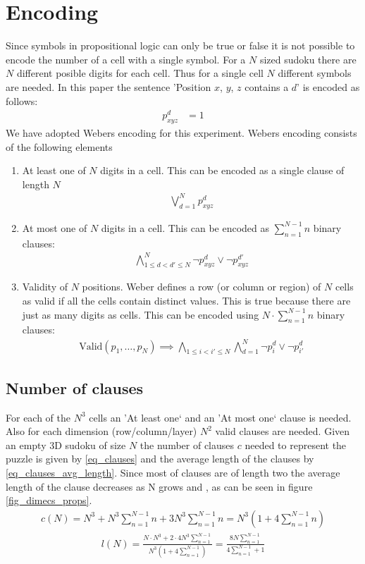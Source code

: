 \documentclass{article}
\begin{document}
\section{Encoding}
Since symbols in propositional logic can only be true or false it is not possible to encode the number of a cell with a single symbol. For a $N$ sized sudoku there are $N$ different posible digits for each cell. Thus for a single cell $N$ different symbols are needed. In this paper the sentence 'Position $x$, $y$, $z$ contains a $d$' is encoded as follows:
\begin{align}
  p_{xyz}^d &= 1
\end{align}
We have adopted Webers \cite{weber2005sat} encoding for this experiment. Webers encoding consists of the following elements
\begin{enumerate}
  \item At least one of $N$ digits in a cell. This can be encoded as a single clause of length $N$
    \begin{align}
      \bigvee_{d=1}^N p_{xyz}^d
    \end{align}
  \item At most one of $N$ digits in a cell. This can be encoded as $\sum_{n=1}^{N-1}n$ binary clauses:
    \begin{align}
      \bigwedge_{1 \leq d < d' \leq N}^N \neg p_{xyz}^d \vee \neg p_{xyz}^{d'}
    \end{align}
  \item Validity of $N$ positions. Weber defines a row (or column or region) of $N$ cells as valid if all the cells contain distinct values. This is true because there are just as many digits as cells. This can be encoded using $N \cdot \sum_{n=1}^{N-1}n$ binary clauses:
    \begin{align}
      \text{Valid}(p_1,\dots,p_N) \implies \bigwedge_{1 \leq i < i' \leq N}\bigwedge_{d=1}^N \neg p_{i}^d \vee \neg p_{i'}^{d}
    \end{align}
\end{enumerate}

\subsection{Number of clauses}
For each of the $N^3$ cells an 'At least one` and an 'At most one` clause is needed. Also for each dimension (row/column/layer) $N^2$ valid clauses are needed. Given an empty 3D sudoku of size $N$ the number of clauses $c$ needed to represent the puzzle is given by \ref{eq_clauses} and the average length of the clauses by \ref{eq_clauses_avg_length}. Since most of clauses are of length two the average length of the clause decreases as N grows and , as can be seen in figure \ref{fig_dimecs_props}.
\begin{align}
  \label{eq_clauses}
  c(N) = N^3 + N^3 \sum_{n=1}^{N-1}n + 3N^3\sum_{n=1}^{N-1}n = N^3(1 + 4\sum_{n=1}^{N-1}n)
\end{align}
\begin{align}
  \label{eq_clauses_avg_length}
  l(N) = \frac{N\cdot N^3 + 2\cdot4 N^3 \sum_{n=1}^{N-1}}{N^3(1 + 4\sum_{n=1}^{N-1})} = \frac{8N\sum_{n=1}^{N-1}}{4\sum_{n=1}^{N-1}+1}
\end{align}
\end{document}
